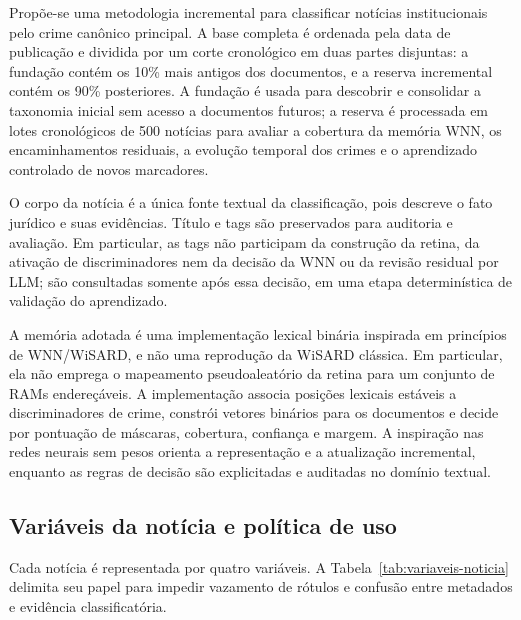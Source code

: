 Propõe-se uma metodologia incremental para classificar notícias institucionais pelo crime canônico principal. A base completa é ordenada pela data de publicação e dividida por um corte cronológico em duas partes disjuntas: a fundação contém os 10\% mais antigos dos documentos, e a reserva incremental contém os 90\% posteriores. A fundação é usada para descobrir e consolidar a taxonomia inicial sem acesso a documentos futuros; a reserva é processada em lotes cronológicos de 500 notícias para avaliar a cobertura da memória WNN, os encaminhamentos residuais, a evolução temporal dos crimes e o aprendizado controlado de novos marcadores.

O corpo da notícia é a única fonte textual da classificação, pois descreve o fato jurídico e suas evidências. Título e tags são preservados para auditoria e avaliação. Em particular, as tags não participam da construção da retina, da ativação de discriminadores nem da decisão da WNN ou da revisão residual por LLM; são consultadas somente após essa decisão, em uma etapa determinística de validação do aprendizado.

A memória adotada é uma implementação lexical binária inspirada em princípios de WNN/WiSARD, e não uma reprodução da WiSARD clássica. Em particular, ela não emprega o mapeamento pseudoaleatório da retina para um conjunto de RAMs endereçáveis. A implementação associa posições lexicais estáveis a discriminadores de crime, constrói vetores binários para os documentos e decide por pontuação de máscaras, cobertura, confiança e margem. A inspiração nas redes neurais sem pesos orienta a representação e a atualização incremental, enquanto as regras de decisão são explicitadas e auditadas no domínio textual.

\subsection{Variáveis da notícia e política de uso}

Cada notícia é representada por quatro variáveis. A Tabela~\ref{tab:variaveis-noticia} delimita seu papel para impedir vazamento de rótulos e confusão entre metadados e evidência classificatória.

